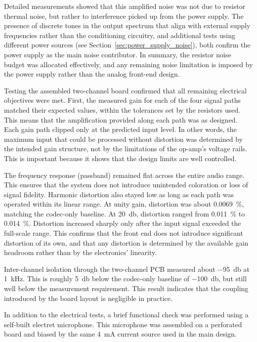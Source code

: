 Detailed measurements showed that this amplified noise was not due to resistor thermal noise, but rather to interference picked up from the power supply. The presence of discrete tones in the output spectrum that align with external supply frequencies rather than the conditioning circuitry, and additional tests using different power sources (see Section~\ref{sec:power_supply_noise}), both confirm the power supply as the main noise contributor. In summary, the resistor noise budget was allocated effectively, and any remaining noise limitation is imposed by the power supply rather than the analog front-end design.

Testing the assembled two-channel board confirmed that all remaining electrical objectives were met. First, the measured gain for each of the four signal paths matched their expected values, within the tolerances set by the resistors used. This means that the amplification provided along each path was as designed. Each gain path clipped only at the predicted input level. In other words, the maximum input that could be processed without distortion was determined by the intended gain structure, not by the limitations of the op-amp’s voltage rails. This is important because it shows that the design limits are well controlled.

The frequency response (passband) remained flat across the entire audio range. This ensures that the system does not introduce unintended coloration or loss of signal fidelity. Harmonic distortion also stayed low as long as each path was operated within its linear range. At unity gain, distortion was about \SI{0.0069}{\percent}, matching the codec-only baseline. At \SI{+20}{\decibel}, distortion ranged from \SI{0.011}{\percent} to \SI{0.014}{\percent}. Distortion increased sharply only after the input signal exceeded the full-scale range. This confirms that the front end does not introduce significant distortion of its own, and that any distortion is determined by the available gain headroom rather than by the electronics' linearity.

Inter-channel isolation through the two-channel PCB measured about \SI{-95}{\decibel} at \SI{1}{\kilo\hertz}. This is roughly \SI{5}{\decibel} below the codec-only baseline of \SI{-100}{\decibel}, but still well below the measurement requirement. This result indicates that the coupling introduced by the board layout is negligible in practice.

In addition to the electrical tests, a brief functional check was performed using a self-built electret microphone. This microphone was assembled on a perforated board and biased by the same \SI{4}{\milli\ampere} current source used in the main design.

